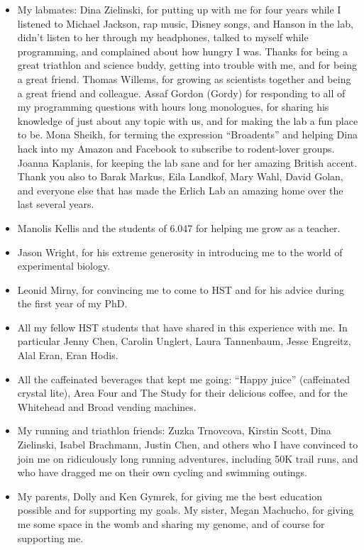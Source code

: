 \begin{itemize}
\item My labmates: Dina Zielinski, for putting up with me for four years while I listened to Michael Jackson, rap music, Disney songs, and Hanson in the lab, didn't listen to her through my headphones, talked to myself while programming, and complained about how hungry I was. Thanks for being a great triathlon and science buddy, getting into trouble with me, and for being a great friend. Thomas Willems, for growing as scientists together and being a great friend and colleague. Assaf Gordon (Gordy) for responding to all of my programming questions with hours long monologues, for sharing his knowledge of just about any topic with us, and for making the lab a fun place to be. Mona Sheikh, for terming the expression ``Broadents'' and helping Dina hack into my Amazon and Facebook to subscribe to rodent-lover groups. Joanna Kaplanis, for keeping the lab sane and for her amazing British accent. Thank you also to Barak Markus, Eila Landkof, Mary Wahl, David Golan, and everyone else that has made the Erlich Lab an amazing home over the last several years.

\item Manolis Kellis and the students of 6.047 for helping me grow as a teacher.

\item Jason Wright, for his extreme generosity in introducing me to the world of experimental biology.

\item Leonid Mirny, for convincing me to come to HST and for his advice during the first year of my PhD.

\item All my fellow HST students that have shared in this experience with me. In particular Jenny Chen, Carolin Unglert, Laura Tannenbaum, Jesse Engreitz, Alal Eran, Eran Hodis.

\item All the caffeinated beverages that kept me going: ``Happy juice'' (caffeinated crystal lite), Area Four and The Study for their delicious coffee, and for the Whitehead and Broad vending machines. 

\item My running and triathlon friends: Zuzka Trnovcova, Kirstin Scott, Dina Zielinski, Isabel Brachmann, Justin Chen, and others who I have convinced to join me on ridiculously long running adventures, including 50K trail runs, and who have dragged me on their own cycling and swimming outings.

\item My parents, Dolly and Ken Gymrek, for giving me the best education possible and for supporting my goals. My sister, Megan Machucho, for giving me some space in the womb and sharing my genome, and of course for supporting me.

\end{itemize}